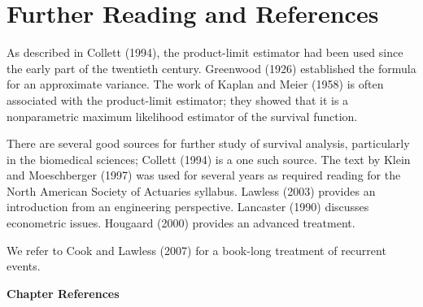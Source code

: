 \section{Further Reading and References}\label{S14:Refer}

As described in Collett (1994), the product-limit estimator had been
used since the early part of the twentieth century. Greenwood (1926)
established the formula for an approximate variance. The work of
Kaplan and Meier (1958) is often associated with the product-limit
estimator; they showed that it is a nonparametric maximum likelihood
estimator of the survival function.

There are several good sources for further study of survival
analysis, particularly in the biomedical sciences; Collett (1994) is
a one such source. The text by Klein and Moeschberger (1997) was
used for several years as required reading for the North American
Society of Actuaries syllabus. Lawless (2003) provides an
introduction from an engineering perspective. Lancaster (1990)
discusses econometric issues. Hougaard (2000) provides an advanced
treatment.

We refer to Cook and Lawless (2007) for a book-long treatment of
recurrent events.

\bigskip

\newpage

\textbf{Chapter References}

